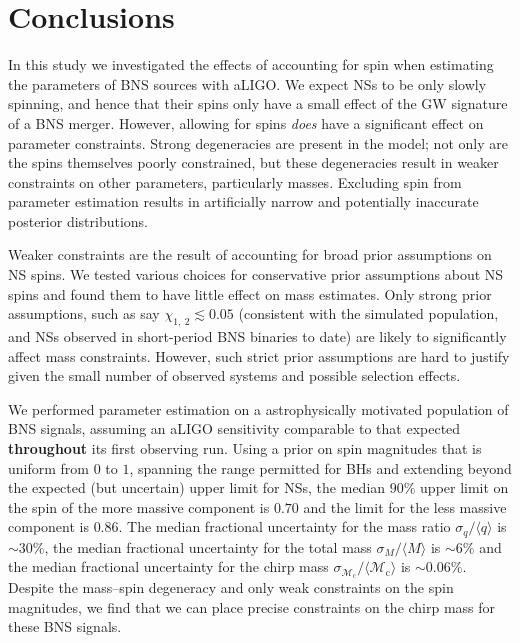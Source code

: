 \section{Conclusions}\label{sec:conclusions}

In this study we investigated the effects of accounting for spin when estimating the parameters of BNS sources with aLIGO. We expect NSs to be only slowly spinning, and hence that their spins only have a small effect of the GW signature of a BNS merger. However, allowing for spins \textit{does} have a significant effect on parameter constraints. Strong degeneracies are present in the model; not only are the spins themselves poorly constrained, but these degeneracies result in weaker constraints on other parameters, particularly masses.  Excluding spin from parameter estimation results in artificially narrow and potentially inaccurate posterior distributions.

Weaker constraints are the result of accounting for broad prior assumptions on NS spins.  We tested various choices for conservative prior assumptions about NS spins and found them to have little effect on mass estimates.  Only strong prior assumptions, such as say $\chi_{1,~2}\lesssim 0.05$ (consistent with the simulated population, and NSs observed in short-period BNS binaries to date) are likely to significantly affect mass constraints.  However, such strict prior assumptions are hard to justify given the small number of observed systems and possible selection effects.

We performed parameter estimation on a astrophysically motivated population of BNS signals, assuming an aLIGO sensitivity comparable to that expected \textbf{throughout} its first observing run. Using a prior on spin magnitudes that is uniform from $0$ to $1$, spanning the range permitted for BHs and extending beyond the expected (but uncertain) upper limit for NSs, the median $90\%$ upper limit on the spin of the more massive component is $0.70$ and the limit for the less massive component is $0.86$. The median fractional uncertainty for the mass ratio $\sigma_q/\langle q \rangle$ is $\sim30\%$, the median fractional uncertainty for the total mass $\sigma_{{M}}/\langle {M} \rangle$ is $\sim6\%$ and the median fractional uncertainty for the chirp mass $\sigma_{\mathcal{M}_\mathrm{c}}/\langle {\mathcal{M}_\mathrm{c}} \rangle$ is $\sim0.06\%$. Despite the mass--spin degeneracy and only weak constraints on the spin magnitudes, we find that we can place precise constraints on the chirp mass for these BNS signals.

